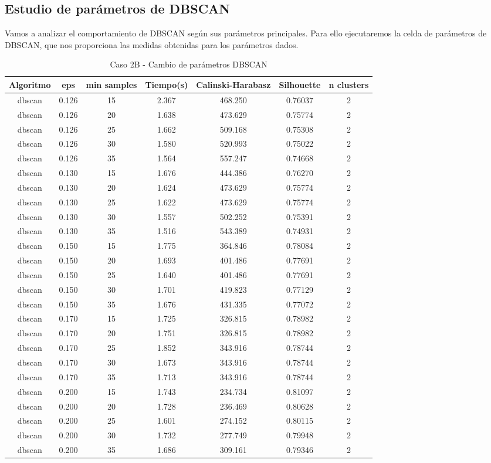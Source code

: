 \subsection{Estudio de parámetros de DBSCAN}

Vamos a analizar el comportamiento de DBSCAN según sus parámetros principales. Para ello ejecutaremos la celda de parámetros de DBSCAN, que nos proporciona las medidas obtenidas para los parámetros dados.

\begin{table}[H]
\centering
\caption{Caso 2B - Cambio de parámetros DBSCAN}
\label{tab:c2B_dbscan}
\begin{tabular}{ccccccc}
\toprule
Algoritmo & eps & min samples & Tiempo(s) & Calinski-Harabasz & Silhouette & n clusters \\
\midrule
dbscan & 0.126 & 15 & 2.367 & 468.250 & 0.76037 & 2 \\
dbscan & 0.126 & 20 & 1.638 & 473.629 & 0.75774 & 2 \\
dbscan & 0.126 & 25 & 1.662 & 509.168 & 0.75308 & 2 \\
dbscan & 0.126 & 30 & 1.580 & 520.993 & 0.75022 & 2 \\
dbscan & 0.126 & 35 & 1.564 & 557.247 & 0.74668 & 2 \\
dbscan & 0.130 & 15 & 1.676 & 444.386 & 0.76270 & 2 \\
dbscan & 0.130 & 20 & 1.624 & 473.629 & 0.75774 & 2 \\
dbscan & 0.130 & 25 & 1.622 & 473.629 & 0.75774 & 2 \\
dbscan & 0.130 & 30 & 1.557 & 502.252 & 0.75391 & 2 \\
dbscan & 0.130 & 35 & 1.516 & 543.389 & 0.74931 & 2 \\
dbscan & 0.150 & 15 & 1.775 & 364.846 & 0.78084 & 2 \\
dbscan & 0.150 & 20 & 1.693 & 401.486 & 0.77691 & 2 \\
dbscan & 0.150 & 25 & 1.640 & 401.486 & 0.77691 & 2 \\
dbscan & 0.150 & 30 & 1.701 & 419.823 & 0.77129 & 2 \\
dbscan & 0.150 & 35 & 1.676 & 431.335 & 0.77072 & 2 \\
dbscan & 0.170 & 15 & 1.725 & 326.815 & 0.78982 & 2 \\
dbscan & 0.170 & 20 & 1.751 & 326.815 & 0.78982 & 2 \\
dbscan & 0.170 & 25 & 1.852 & 343.916 & 0.78744 & 2 \\
dbscan & 0.170 & 30 & 1.673 & 343.916 & 0.78744 & 2 \\
dbscan & 0.170 & 35 & 1.713 & 343.916 & 0.78744 & 2 \\
dbscan & 0.200 & 15 & 1.743 & 234.734 & 0.81097 & 2 \\
dbscan & 0.200 & 20 & 1.728 & 236.469 & 0.80628 & 2 \\
dbscan & 0.200 & 25 & 1.601 & 274.152 & 0.80115 & 2 \\
dbscan & 0.200 & 30 & 1.732 & 277.749 & 0.79948 & 2 \\
dbscan & 0.200 & 35 & 1.686 & 309.161 & 0.79346 & 2 \\
\bottomrule
\end{tabular}
\end{table}

